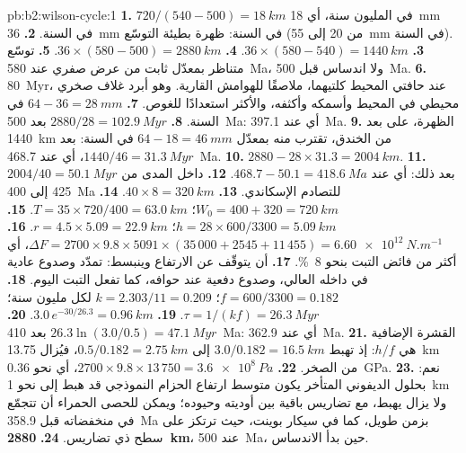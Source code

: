 \begin{solution}{pb:b2:wilson-cycle:1}
\textbf{1.} $720/(540 - 500) = \qty{18}{km}$ في المليون سنة، أي \qty{18}{mm} في السنة.
\textbf{2.} \qty{36}{mm} في السنة: ظهرة بطيئة التوسّع (من 20 إلى \qty{55}{mm} في السنة).
\textbf{3.} $36\times(580 - 540) = \qty{1440}{km}$.
\textbf{4.} $36\times(580 - 500) = \qty{2880}{km}$.
\textbf{5.} توسّع متناظر بمعدّل ثابت من عرض صفري عند \qty{580}{Ma}، ولا
اندساس قبل \qty{500}{Ma}.
\textbf{6.} \qty{80}{Myr}، عند حافتي المحيط كلتيهما، ملاصقًا للهوامش القارية. وهو
أبرد غلاف صخري محيطي في المحيط وأسمكه وأكثفه، والأكثر استعدادًا للغوص.
\textbf{7.} $64 - 36 = \qty{28}{mm}$ في السنة.
\textbf{8.} $2880/28 = \qty{102.9}{Myr}$ بعد \qty{500}{Ma}: أي عند \qty{397.1}{Ma}.
\textbf{9.} الظهرة، على بعد \qty{1440}{km} من الخندق، تقترب منه بمعدّل $64 - 18 =
\qty{46}{mm}$ في السنة: بعد $1440/46 = \qty{31.3}{Myr}$، أي عند \qty{468.7}{Ma}.
\textbf{10.} $2880 - 28\times31.3 = \qty{2004}{km}$.
\textbf{11.} $2004/40 = \qty{50.1}{Myr}$ بعد ذلك: أي عند $468.7 - 50.1 = \qty{418.6}{Ma}$.
\textbf{12.} داخل المدى من 425 إلى \qty{400}{Ma} للتصادم الإسكاندي.
\textbf{13.} $40\times8 = \qty{320}{km}$.
\textbf{14.} $W_0 = 400 + 320 = \qty{720}{km}$؛ $T = 35\times720/400 = \qty{63.0}{km}$.
\textbf{15.} $h = 28\times600/3300 = \qty{5.09}{km}$؛ $r = 4.5\times5.09 = \qty{22.9}{km}$.
\textbf{16.} $\Delta F = 2700\times9.8\times5091\times(35\,000 + 2545 + 11\,455) =
\qty{6.60e12}{N.m^{-1}}$، أي أكثر من فائض التبت بنحو \qty{8}{\percent}.
\textbf{17.} أن يتوقّف عن الارتفاع وينبسط: تمدّد وصدوع عادية في داخله العالي،
وصدوع دفعية عند حوافه، كما تفعل التبت اليوم.
\textbf{18.} $f = 600/3300 = 0.182$؛ $k = 2.303/11 = 0.209$ لكل مليون سنة؛ $\tau = 1/(kf)
= \qty{26.3}{Myr}$.
\textbf{19.} $3.0\,e^{-30/26.3} = \qty{0.96}{km}$.
\textbf{20.} $26.3\ln(3.0/0.5) = \qty{47.1}{Myr}$ بعد \qty{410}{Ma}: أي عند \qty{362.9}{Ma}.
\textbf{21.} القشرة الإضافية هي $h/f$: إذ تهبط $3.0/0.182 = \qty{16.5}{km}$ إلى $0.5/0.182 =
\qty{2.75}{km}$، فيُزال \qty{13.75}{km} من الصخر.
\textbf{22.} $2700\times9.8\times13\,750 = \qty{3.6e8}{Pa}$، أي نحو \qty{0.36}{GPa}.
\textbf{23.} نعم: بحلول الديفوني المتأخر يكون متوسط ارتفاع الحزام النموذجي قد هبط إلى نحو \qty{1}{km}
ولا يزال يهبط، مع تضاريس باقية بين أوديته وحيوده؛ ويمكن للحصى الحمراء أن
تتجمّع في منخفضاته قبل \qty{358.9}{Ma} بزمن طويل، كما في سيكار بوينت، حيث ترتكز على سطح
ذي تضاريس.
\textbf{24.} \textbf{\qty[text-series-to-math=true]{2880}{km}}، عند \qty{500}{Ma}، حين
بدأ الاندساس.
\end{solution}
